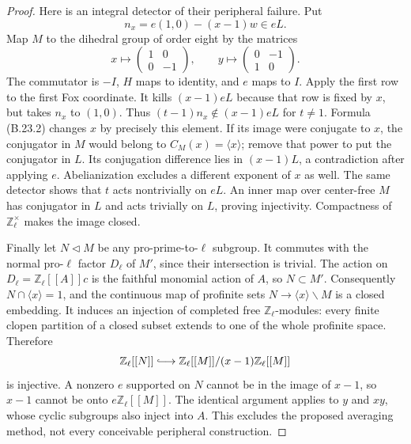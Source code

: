 \begin{proof}
Here is an integral detector of their peripheral failure. Put
\[
                   n_x=e(1,0)-(x-1)w\in eL.
\]
Map $M$ to the dihedral group of order eight by the matrices
\[
 x\longmapsto\begin{pmatrix}1&0\\0&-1\end{pmatrix},\qquad
 y\longmapsto\begin{pmatrix}0&-1\\1&0\end{pmatrix}.
\]
The commutator is $-I$, $H$ maps to identity, and $e$ maps to
$I$. Apply the first row to the first Fox coordinate. It kills
$(x-1)eL$ because that row is fixed by $x$, but takes $n_x$
to $(1,0)$. Thus $(t-1)n_x\notin(x-1)eL$ for $t\ne1$.
Formula (B.23.2) changes $x$ by precisely this element.
If its image were conjugate to $x$, the conjugator in $M$
would belong to $C_M(x)=\langle x\rangle$; remove that power
to put the conjugator in $L$. Its conjugation difference lies
in $(x-1)L$, a contradiction after applying $e$.
Abelianization excludes a different exponent of $x$ as well.
The same detector shows that $t$ acts nontrivially on $eL$.
An inner map over center-free $M$ has conjugator in $L$ and
acts trivially on $L$, proving injectivity. Compactness of
$\mathbb Z_\ell^\times$ makes the image closed.

Finally let $N\triangleleft M$ be any pro-prime-to-$\ell$
subgroup. It commutes with the normal pro-$\ell$ factor
$D_\ell$ of $M'$, since their intersection is trivial.
The action on $D_\ell=\mathbb Z_\ell[[A]]c$ is the faithful
monomial action of $A$, so $N\subset M'$.
Consequently $N\cap\langle x\rangle=1$, and the continuous
map of profinite sets $N\to\langle x\rangle\backslash M$
is a closed embedding. It induces an injection of completed
free $\mathbb Z_\ell$-modules: every finite clopen partition
of a closed subset extends to one of the whole profinite space.
Therefore
\[
 \mathbb Z_\ell[[N]]\lhook\joinrel\longrightarrow
 \mathbb Z_\ell[[M]]/(x-1)\mathbb Z_\ell[[M]]
\]
is injective. A nonzero $e$ supported on $N$ cannot be in the
image of $x-1$, so $x-1$ cannot be onto $e\mathbb Z_\ell[[M]]$.
The identical argument applies to $y$ and $xy$, whose cyclic
subgroups also inject into $A$. This excludes the proposed
averaging method, not every conceivable peripheral construction.
\end{proof}

